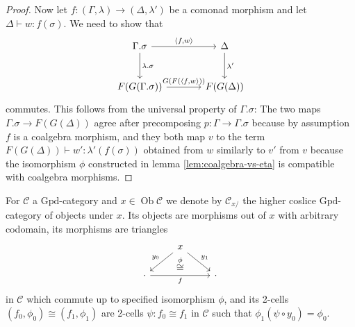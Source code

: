 \documentclass[a4paper]{article}
\theoremstyle{remark}
\theoremstyle{definition}
\begin{document}
\begin{proof}
  Now let $f : (\Gamma, \lambda) \rightarrow (\Delta, \lambda')$ be a comonad morphism and let $\Delta \vdash w : f(\sigma)$.
  We need to show that
  \begin{equation}
    \begin{tikzcd}[column sep=large, row sep=large]
      \Gamma.\sigma \arrow[r, "{\langle f, w \rangle}"] \arrow[d, "\lambda.\sigma"] & \Delta \arrow[d, "\lambda'"] \\
      F(G(\Gamma.\sigma)) \arrow[r, "{G(F(\langle f, w \rangle}))"] & F(G(\Delta))
    \end{tikzcd}
  \end{equation}
  commutes.
  This follows from the universal property of $\Gamma.\sigma$:
  The two maps $\Gamma.\sigma \rightarrow F(G(\Delta))$ agree after precomposing $p : \Gamma \rightarrow \Gamma.\sigma$ because by assumption $f$ is a coalgebra morphism, and they both map $v$ to the term $F(G(\Delta)) \vdash w' : \lambda'(f(\sigma))$ obtained from $w$ similarly to $v'$ from $v$ because the isomorphism $\phi$ constructed in lemma \ref{lem:coalgebra-vs-eta} is compatible with coalgebra morphisms.
\end{proof}

For $\mathcal{C}$ a $\mathrm{Gpd}$-category and $x \in \operatorname{Ob} \mathcal{C}$ we denote by $\mathcal{C}_{x / }$ the higher coslice $\mathrm{Gpd}$-category of objects under $x$.
Its objects are morphisms out of $x$ with arbitrary codomain, its morphisms are triangles
\begin{equation}
  \begin{tikzcd}
    & x \arrow[dl, "y_0"'] \arrow[dr, "y_1"] \arrow[d, "\overset{\phi}{\cong}", phantom] & \\
    \cdot \arrow[rr, "f"'] & \, & \cdot
  \end{tikzcd}
\end{equation}
in $\mathcal{C}$ which commute up to specified isomorphism $\phi$, and its 2-cells $(f_0, \phi_0) \cong (f_1, \phi_1)$ are 2-cells $\psi : f_0 \cong f_1$ in $\mathcal{C}$ such that $\phi_1 (\psi \circ y_0) = \phi_0$.
\end{document}
